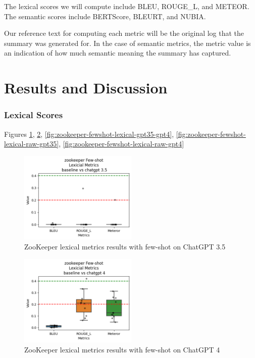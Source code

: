 \documentclass[conference]{IEEEtran}
\begin{document}
The lexical scores we will compute include BLEU, ROUGE\_L, and METEOR. The semantic scores include BERTScore, BLEURT, and NUBIA.

Our reference text for computing each metric will be the original log that the summary was generated for. In the case of semantic metrics, the metric value is an indication of how much semantic meaning the summary has captured.

\section{Results and Discussion}


\subsubsection{Lexical Scores}

Figures \ref{fig:zookeeper-fewshot-lexical-gpt35}, \ref{fig:zookeeper-fewshot-lexical-gpt4}, \ref{fig:zookeeper-fewshot-lexical-gpt35-gpt4}, \ref{fig:zookeeper-fewshot-lexical-raw-gpt35}, \ref{fig:zookeeper-fewshot-lexical-raw-gpt4}

\begin{figure}[h!]
    \centering
    \includegraphics[width=0.5\textwidth]{milestone4/img/zookeeper-few-shot-lexical-3.5.png}
    \caption{ZooKeeper lexical metrics results with few-shot on ChatGPT 3.5}
    \label{fig:zookeeper-fewshot-lexical-gpt35}
\end{figure}

\begin{figure}[h!]
    \centering
    \includegraphics[width=0.5\textwidth]{milestone4/img/zookeeper-few-shot-lexical-4.png}
    \caption{ZooKeeper lexical metrics results with few-shot on ChatGPT 4}
    \label{fig:zookeeper-fewshot-lexical-gpt4}
\end{figure}
\end{document}
